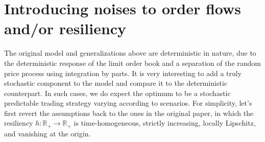 \documentclass[openany,oneside]{article}
\theoremstyle{definition}
\theoremstyle{remark}
\begin{document}
\section{Introducing noises to order flows and/or resiliency}
The original model and generalizations above are deterministic in nature, due to the deterministic response of the limit order book and a separation of the random price process using integration by parts. It is very interesting to add a truly stochastic component to the model and compare it to the deterministic counterpart. In such cases, we do expect the optimum to be a stochastic predictable trading strategy varying according to scenarios. For simplicity, let's first revert the assumptions back to the ones in the original paper, in which the resiliency $h:\mathbb{R}_+ \to \mathbb{R}_+$ is time-homogeneous, strictly increasing, locally Lipschitz, and vanishing at the origin.
\end{document}
